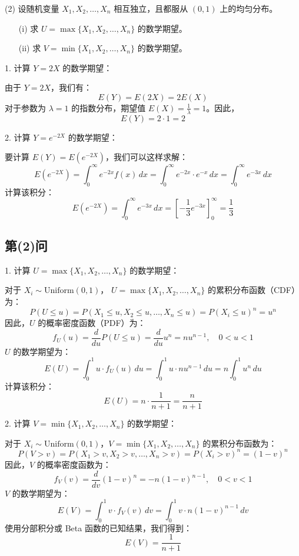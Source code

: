 \documentclass[twoside]{article}
\begin{document}
   (2) 设随机变量 \( X_1, X_2, \dots, X_n \) 相互独立，且都服从 \( (0,1) \) 上的均匀分布。
   \begin{itemize}
       \item[(i)] 求 \( U = \max\{X_1, X_2, \dots, X_n\} \) 的数学期望。
       \item[(ii)] 求 \( V = \min\{X_1, X_2, \dots, X_n\} \) 的数学期望。
   \end{itemize}

\begin{ans}{7}{7}

    1. 计算 \( Y = 2X \) 的数学期望：

   由于 \( Y = 2X \)，我们有：
   \[
   E(Y) = E(2X) = 2E(X)
   \]
   对于参数为 \( \lambda = 1 \) 的指数分布，期望值 \( E(X) = \frac{1}{\lambda} = 1 \)。因此，
   \[
   E(Y) = 2 \cdot 1 = 2
   \]

2. 计算 \( Y = e^{-2X} \) 的数学期望：

   要计算 \( E(Y) = E(e^{-2X}) \)，我们可以这样求解：
   \[
   E(e^{-2X}) = \int_{0}^{\infty} e^{-2x} f(x) \, dx = \int_{0}^{\infty} e^{-2x} \cdot e^{-x} \, dx = \int_{0}^{\infty} e^{-3x} \, dx
   \]
   计算该积分：
   \[
   E(e^{-2X}) = \int_{0}^{\infty} e^{-3x} \, dx = \left[ -\frac{1}{3} e^{-3x} \right]_{0}^{\infty} = \frac{1}{3}
   \]

\subsection*{第(2)问}

1. 计算 \( U = \max\{X_1, X_2, \dots, X_n\} \) 的数学期望：

   对于 \( X_i \sim \text{Uniform}(0,1) \)， \( U = \max\{X_1, X_2, \dots, X_n\} \) 的累积分布函数（CDF）为：
   \[
   P(U \leq u) = P(X_1 \leq u, X_2 \leq u, \dots, X_n \leq u) = P(X_i \leq u)^n = u^n
   \]
   因此，\( U \) 的概率密度函数（PDF）为：
   \[
   f_U(u) = \frac{d}{du} P(U \leq u) = \frac{d}{du} u^n = n u^{n-1}, \quad 0 < u < 1
   \]
   \( U \) 的数学期望为：
   \[
   E(U) = \int_{0}^{1} u \cdot f_U(u) \, du = \int_{0}^{1} u \cdot n u^{n-1} \, du = n \int_{0}^{1} u^n \, du
   \]
   计算该积分：
   \[
   E(U) = n \cdot \frac{1}{n+1} = \frac{n}{n+1}
   \]

2. 计算 \( V = \min\{X_1, X_2, \dots, X_n\} \) 的数学期望：

   对于 \( X_i \sim \text{Uniform}(0,1) \)，\( V = \min\{X_1, X_2, \dots, X_n\} \) 的累积分布函数为：
   \[
   P(V > v) = P(X_1 > v, X_2 > v, \dots, X_n > v) = P(X_i > v)^n = (1 - v)^n
   \]
   因此，\( V \) 的概率密度函数为：
   \[
   f_V(v) = \frac{d}{dv} (1 - v)^n = -n (1 - v)^{n-1}, \quad 0 < v < 1
   \]
   \( V \) 的数学期望为：
   \[
   E(V) = \int_{0}^{1} v \cdot f_V(v) \, dv = \int_{0}^{1} v \cdot n (1 - v)^{n-1} \, dv
   \]
   使用分部积分或 Beta 函数的已知结果，我们得到：
   \[
   E(V) = \frac{1}{n+1}
   \]
\end{ans}
\end{document}
